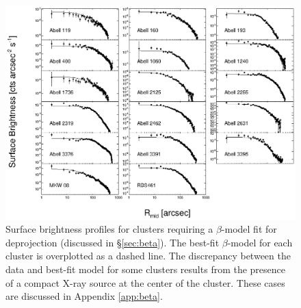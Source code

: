 \clearpage
\begin{figure}[htp]
  \begin{center}
    \begin{minipage}[htp]{0.9\linewidth}
      \includegraphics*[width=\textwidth, trim=15mm 10mm 10mm 10mm, clip]{beta.eps}
      \caption{Surface brightness profiles for clusters requiring a
        $\beta$-model fit for deprojection (discussed in \S\ref{sec:beta}). The best-fit
        $\beta$-model for each cluster is overplotted as a dashed
        line. The discrepancy between the data and best-fit model for
        some clusters results from the presence of a compact X-ray
        source at the center of the cluster. These cases are discussed
        in Appendix \ref{app:beta}.}
      \label{fig:betamods}
    \end{minipage}
  \end{center}
\end{figure}

